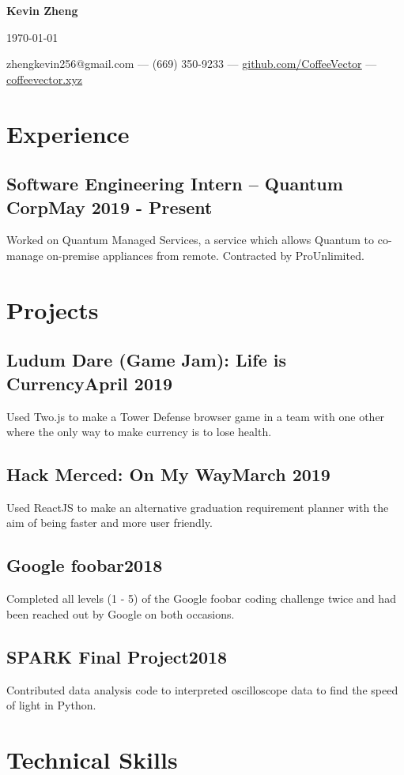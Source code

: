 \documentclass[letterpaper,12pt]{article}
\makeatletter
\newcommand\textbox[1]{%
    \parbox{.333\textwidth}{#1}%
}
\renewcommand{\maketitle}{
    \begin{center}
        \noindent\textbox{\hfill}\textbox{\hfil\bfseries\huge Kevin Zheng\hfil}\textbox{\hfill \today}
        {\faEnvelope \enskip zhengkevin256@gmail.com --- \faPhone \enskip (669) 350-9233 --- \faGithub \enskip \underline{\color{blue}\href{https://github.com/CoffeeVector}{github.com/CoffeeVector}} --- \faChain \enskip \underline{\color{blue}\href{https://coffeevector.xyz}{coffeevector.xyz}}}
    \end{center} }
\makeatother
\begin{document}
\maketitle
\section{Experience}
    \subsection{Software Engineering Intern -- Quantum Corp\null\hfill May 2019 - Present}
    Worked on Quantum Managed Services, a service which allows Quantum to co-manage on-premise appliances from remote.
Contracted by ProUnlimited.
    \vspace*{-2mm}
\section{Projects}
    \subsection{Ludum Dare (Game Jam): Life is Currency\null\hfill April 2019}
    Used Two.js to make a Tower Defense browser game in a team with one other where the only way to make currency is to lose health.
    \vspace*{-2mm}
    \subsection{Hack Merced: On My Way\null\hfill March 2019}
    Used ReactJS to make an alternative graduation requirement planner with the aim of being faster and more user friendly.
    \vspace*{-2mm}
    \subsection{Google foobar\null\hfill 2018}
    Completed all levels (1 - 5) of the Google foobar coding challenge twice and had been reached out by Google on both occasions.
    \vspace*{-2mm}
    \subsection{SPARK Final Project\null\hfill 2018}
    Contributed data analysis code to interpreted oscilloscope data to find the speed of light in Python.
    \vspace*{-2mm}
\section{Technical Skills}
\end{document}
